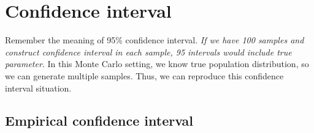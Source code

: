 \documentclass[]{book}
\newenvironment{Shaded}{\begin{snugshade}}{\end{snugshade}}
\newcommand{\CommentTok}[1]{\textcolor[rgb]{0.56,0.35,0.01}{\textit{#1}}}
\newcommand{\DataTypeTok}[1]{\textcolor[rgb]{0.13,0.29,0.53}{#1}}
\newcommand{\DecValTok}[1]{\textcolor[rgb]{0.00,0.00,0.81}{#1}}
\newcommand{\KeywordTok}[1]{\textcolor[rgb]{0.13,0.29,0.53}{\textbf{#1}}}
\newcommand{\NormalTok}[1]{#1}
\newcommand{\OperatorTok}[1]{\textcolor[rgb]{0.81,0.36,0.00}{\textbf{#1}}}
\newcommand{\StringTok}[1]{\textcolor[rgb]{0.31,0.60,0.02}{#1}}
\theoremstyle{definition}
\theoremstyle{definition}
\theoremstyle{definition}
\theoremstyle{remark}
\begin{document}
\begin{Shaded}
\end{Shaded}

\hypertarget{confidence-interval}{%
\section{Confidence interval}\label{confidence-interval}}

Remember the meaning of 95\% confidence interval. \emph{If we have 100 samples and construct confidence interval in each sample, 95 intervals would include true parameter}. In this Monte Carlo setting, we know true population distribution, so we can generate multiple samples. Thus, we can reproduce this confidence interval situation.

\hypertarget{empirical-confidence-interval}{%
\subsection{Empirical confidence interval}\label{empirical-confidence-interval}}
\end{document}
